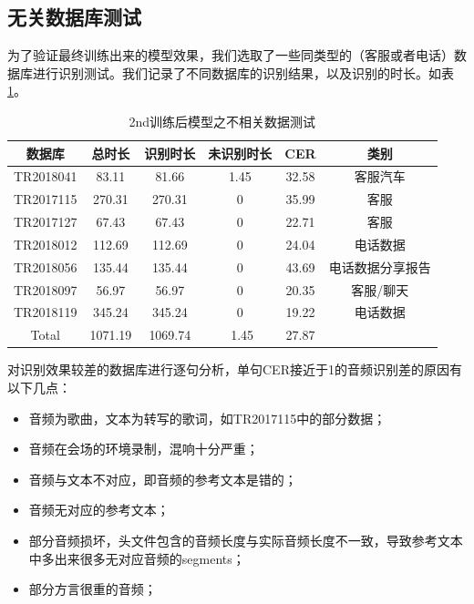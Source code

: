 \subsection{无关数据库测试}
为了验证最终训练出来的模型效果，我们选取了一些同类型的（客服或者电话）数据库进行识别测试。我们记录了不同数据库的识别结果，以及识别的时长。如表\ref{tab:other-corpus}。
\begin{table}[h]
 \centering
 \caption{2nd训练后模型之不相关数据测试}
	 \begin{tabular*}{1\textwidth}{@{\extracolsep{\fill}}cccccc}
	 \toprule
		{\bf 数据库   } & {\bf 总时长   } & {\bf 识别时长   } & {\bf 未识别时长    } & {\bf CER    } & {\bf 类别    } \\
	 \midrule
		TR2018041 &     83.11  &    81.66  &     1.45&       32.58&       客服\/汽车  \\
		TR2017115 &     270.31 &    270.31 &     0   &       35.99&       客服        \\
		TR2017127 &     67.43  &    67.43  &     0   &       22.71&       客服        \\
		TR2018012 &     112.69 &    112.69 &     0   &       24.04&       电话数据     \\
		TR2018056 &     135.44 &    135.44 &     0   &       43.69&       电话数据\/分享报告 \\
		TR2018097 &     56.97  &    56.97  &     0   &       20.35&       客服/聊天   \\
		TR2018119 &     345.24 &    345.24 &     0   &       19.22&       电话数据     \\
		Total     &     1071.19&    ‬1069.74&‬     1.45&       27.87&      			  \\
	 \bottomrule
	 \end{tabular*}%
 \label{tab:other-corpus}%
\end{table}%

对识别效果较差的数据库进行逐句分析，单句CER接近于1的音频识别差的原因有以下几点：
\begin{itemize}
	\item 音频为歌曲，文本为转写的歌词，如TR2017115中的部分数据；
	\item 音频在会场的环境录制，混响十分严重；
	\item 音频与文本不对应，即音频的参考文本是错的；
	\item 音频无对应的参考文本；
	\item 部分音频损坏，头文件包含的音频长度与实际音频长度不一致，导致参考文本中多出来很多无对应音频的segments；
	\item 部分方言很重的音频；
\end{itemize}

